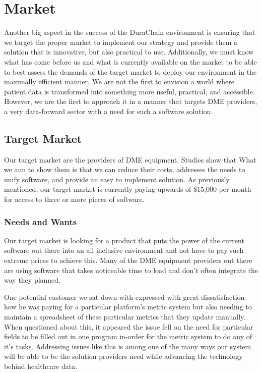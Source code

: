\documentclass[12pt]{article}
\begin{document}
\section{Market}
Another big aspect in the success of the DuraChain environment is ensuring that we target the proper market to implement our strategy and provide them a solution that is innovative, but also practical to use. Additionally, we must know what has come before us and what is currently available on the market to be able to best assess the demands of the target market to deploy our environment in the maximally efficient manner. We are not the first to envision a world where patient data is transformed into something more useful, practical, and accessible. However, we are the first to approach it in a manner that targets DME providers, a very data-forward sector with a need for such a software solution.

  \subsection{Target Market}
  Our target market are the providers of DME equipment. Studies show that What we aim to show them is that we can reduce their costs, addresses the needs to unify software, and provide an easy to implement solution. As previously mentioned, our target market is currently paying upwards of \$15,000 per month for access to three or more pieces of software.

    \subsubsection{Needs and Wants}
    Our target market is looking for a product that puts the power of the current software out there into an all inclusive environment and not have to pay such extreme prices to achieve this. Many of the DME equipment providers out there are using software that takes noticeable time to load and don’t often integrate the way they planned.

    One potential customer we sat down with expressed with great dissatisfaction how he was paying for a particular platform’s metric system but also needing to maintain a spreadsheet of these particular metrics that they update manually. When questioned about this, it appeared the issue fell on the need for particular fields to be filled out in one program in-order for the metric system to do any of it’s tasks. Addressing issues like this is among one of the many ways our system will be able to be the solution providers need while advancing the technology behind healthcare data.
\end{document}
